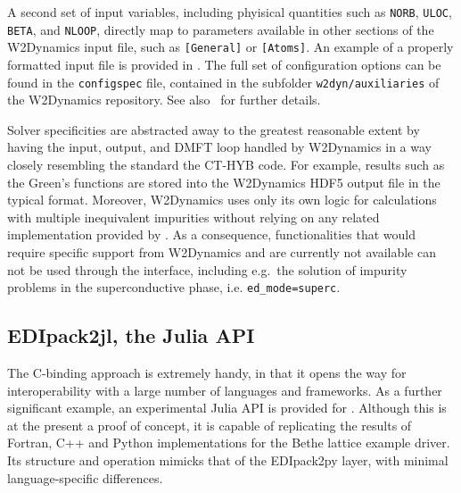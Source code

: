\documentclass[edipack_sp.tex]{subfiles}
\begin{document}
A second set of input variables, including phyisical quantities such as {\tt NORB}, {\tt ULOC}, {\tt BETA}, and {\tt   NLOOP}, directly map to parameters available in other sections of the W2Dynamics input file, such as {\tt [General]} or {\tt [Atoms]}. An example of a properly formatted input file is provided in . The full set of configuration options can be found in the {\tt configspec} file, contained in the subfolder {\tt w2dyn/auxiliaries} of the W2Dynamics repository. See also~\cite{Wallerberger2019CPC}
for further details.


Solver specificities are abstracted away to the greatest reasonable extent by having the input, output, and DMFT loop handled by W2Dynamics in a way closely resembling the standard the CT-HYB code. For example, results such as the Green's functions are stored into the W2Dynamics HDF5 output file in the typical format. Moreover, W2Dynamics uses only its own logic for calculations with multiple inequivalent impurities without relying on any related implementation provided by \NAME{}. As a consequence, functionalities that would require specific support from W2Dynamics and are currently not available can not be used through the interface, including e.g.\ the solution of impurity problems in the superconductive phase, i.e. {\tt ed\_mode=superc}.



\subsection{EDIpack2jl, the Julia API}\label{sSecInteropEDIjl}
The C-binding approach is extremely handy, in that it opens the way for interoperability  with a large number of languages and frameworks. 
As a further significant example, an experimental Julia API 
is provided for \NAME. Although this is at the present a proof of concept, it is capable of replicating the results of Fortran, C++ and
Python implementations for the Bethe lattice example driver.
Its structure and operation mimicks that of the EDIpack2py layer, with minimal language-specific differences.
\end{document}
